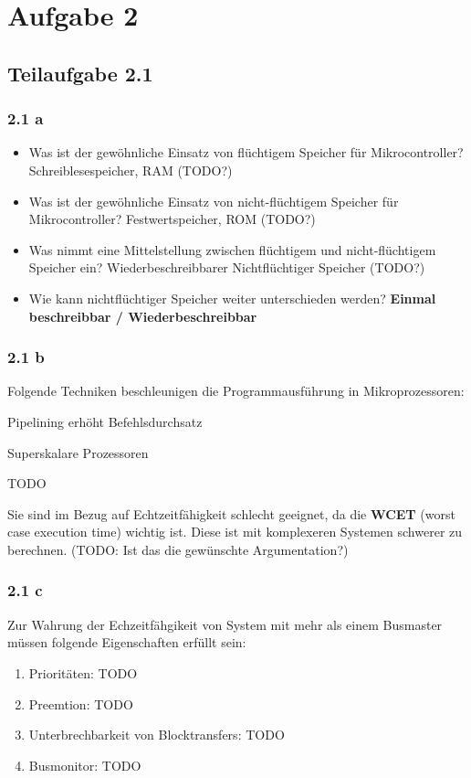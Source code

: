 \documentclass[a4paper]{scrartcl}
\begin{document}
  \section*{Aufgabe 2}
  \subsection*{Teilaufgabe 2.1}
  \subsubsection*{2.1 a}
  \begin{itemize}
      \item Was ist der gewöhnliche Einsatz von flüchtigem Speicher für Mikrocontroller?
            Schreiblesespeicher, RAM (TODO?)
      \item Was ist der gewöhnliche Einsatz von nicht-flüchtigem Speicher für Mikrocontroller?
            Festwertspeicher, ROM (TODO?)
      \item Was nimmt eine Mittelstellung zwischen flüchtigem und nicht-flüchtigem Speicher ein?
            Wiederbeschreibbarer Nichtflüchtiger Speicher (TODO?)
      \item Wie kann nichtflüchtiger Speicher weiter unterschieden werden?
            \textbf{Einmal beschreibbar / Wiederbeschreibbar}
  \end{itemize}

  \subsubsection*{2.1 b}
  Folgende Techniken beschleunigen die Programmausführung in Mikroprozessoren:
  \begin{enumerate*}[label=(\arabic*)]
      \item Pipelining erhöht Befehlsdurchsatz
      \item Superskalare Prozessoren
      \item TODO
  \end{enumerate*}

  Sie sind im Bezug auf Echtzeitfähigkeit schlecht geeignet, da die \textbf{WCET}
  (worst case execution time) wichtig ist. Diese ist mit komplexeren Systemen
  schwerer zu berechnen. (TODO: Ist das die gewünschte Argumentation?)

  \subsubsection*{2.1 c}
  Zur Wahrung der Echzeitfähgikeit von System mit mehr als einem Busmaster
  müssen folgende Eigenschaften erfüllt sein:
  \begin{enumerate}
      \item Prioritäten: TODO
      \item Preemtion: TODO
      \item Unterbrechbarkeit von Blocktransfers: TODO
      \item Busmonitor: TODO
  \end{enumerate}
\end{document}

